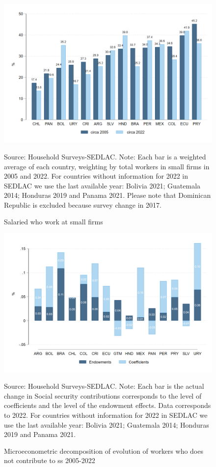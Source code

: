 \documentclass[english]{article}
\begin{document}
\begin{figure}[H]
    \justifying
     \caption{Salaried who work at small firms}     
     \centerline{\includegraphics[scale=.3]{latex/figures/Snapshot/snapshot_dependents_small.png}
    \label{fig:SalariedSmall}}
    \footnotesize{Source: Household Surveys-SEDLAC.}
    \footnotesize{Note: Each bar is a weighted average of each country, weighting by total workers in small firms in 2005 and 2022. For countries without information for 2022 in SEDLAC we use the last available year: Bolivia 2021; Guatemala 2014; Honduras 2019 and Panama 2021. Please note that Dominican Republic is excluded because survey change in 2017.}
\end{figure}


\begin{figure}[H]
        \justifying
        \caption{Microeconometric decomposition of evolution of workers who does not contribute to ss 2005-2022}     
       \centerline{\includegraphics[scale=.3]{latex/figures/Snapshot/Oaxaca decomposition level.png}
        \label{fig:Oaxaca_level}}
        \footnotesize{Source: Household Surveys-SEDLAC.}
        \footnotesize{Note: Each bar is the actual change in Social security contributions corresponds to the level of coefficients and the level of the endowment effects.  Data corresponds to 2022. For countries without information for 2022 in SEDLAC we use the last available year: Bolivia 2021; Guatemala 2014; Honduras 2019 and Panama 2021.}
 \end{figure}
\end{document}
